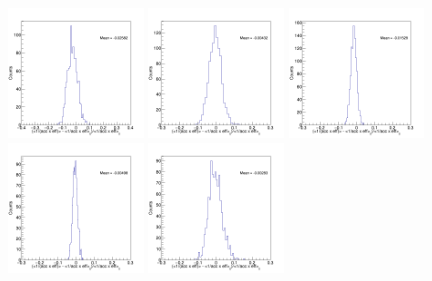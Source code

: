 \begin{figure}[h]
\begin{center}
\includegraphics[width= 0.32\textwidth]{Figures/Chapter4/BPEffONLY_0_90_0.png}
\includegraphics[width= 0.32\textwidth]{Figures/Chapter4/BPEffONLY_0_90_1.png}
\includegraphics[width= 0.32\textwidth]{Figures/Chapter4/BPEffONLY_0_90_2.png}
\includegraphics[width= 0.32\textwidth]{Figures/Chapter4/BPEffONLY_0_90_3.png}
\includegraphics[width= 0.32\textwidth]{Figures/Chapter4/BPEffONLY_0_30_-1.png}

\end{center}
\end{figure}
